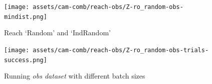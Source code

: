   \begin{figure}[htpb]
    \centering
    \texttt{[image: assets/cam-comb/reach-obs/Z-ro\_random-obs-mindist.png]}
    \caption{Reach `Random' and `IndRandom'}
  \end{figure}

  \begin{figure}[htpb]
    \centering
    \texttt{[image: assets/cam-comb/reach-obs/Z-ro\_random-obs-trials-success.png]}
    \caption{Running \emph{obs dataset} with different batch sizes}\label{apx:Z-ro_random-obs-trials-success}
  \end{figure}